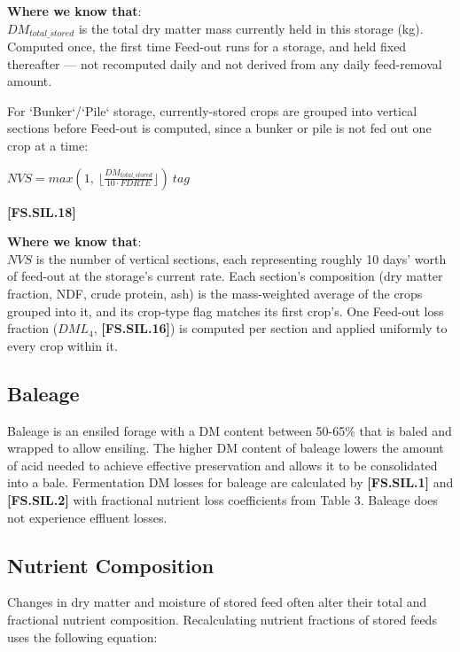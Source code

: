 \begin{refsection}
\textbf{Where we know that}: \\ \(DM_{total\_stored}\) is the total dry matter mass currently held in
this storage (kg). Computed once, the first time Feed-out runs for a storage, and held fixed
thereafter — not recomputed daily and not derived from any daily feed-removal amount.
\vspace{0.2cm}

For `Bunker`/`Pile` storage, currently-stored crops are grouped into vertical sections before Feed-out
is computed, since a bunker or pile is not fed out one crop at a time:
\vspace{0.2cm}

        \begin{center}
        \(NVS = max(1,\ \lfloor \frac{DM_{total\_stored}}{10 \cdot FDRTE} \rfloor)\ tag\)
    \end{center}
        \vspace{0.5cm}

            {\raggedleft \textbf{[FS.SIL.18]}\par}
        \vspace{0.5cm}

\textbf{Where we know that}: \\ \(NVS\) is the number of vertical sections, each representing roughly
10 days' worth of feed-out at the storage's current rate. Each section's composition (dry matter
fraction, NDF, crude protein, ash) is the mass-weighted average of the crops grouped into it, and its
crop-type flag matches its first crop's. One Feed-out loss fraction (\(DML_4\), \textbf{[FS.SIL.16]})
is computed per section and applied uniformly to every crop within it.

\subsection{Baleage}
Baleage is an ensiled forage with a DM content between 50-65\% that is baled and wrapped to allow ensiling. The higher DM content of baleage lowers the amount of acid needed to achieve effective preservation and allows it to be consolidated into a bale. Fermentation DM losses for baleage are calculated by \textbf{[FS.SIL.1]} and \textbf{[FS.SIL.2]} with fractional nutrient loss coefficients from Table 3. Baleage does not experience effluent losses.

\subsection{Nutrient Composition}
Changes in dry matter and moisture of stored feed often alter their total and fractional nutrient composition. Recalculating nutrient fractions of stored feeds uses the following equation:
\vspace{0.2cm}


\end{refsection}
